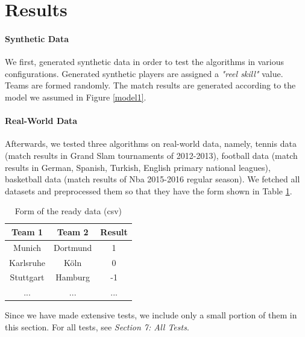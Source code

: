 \documentclass[12pt]{article}
\begin{document}
\section{Results}
\paragraph{Synthetic Data}
We first, generated synthetic data in order to test the algorithms in various configurations. Generated synthetic players are assigned a \textit{"reel skill"} value. Teams are formed randomly. The match results are generated according to the model we assumed in Figure \ref{model1}.
\paragraph{Real-World Data}
Afterwards, we tested three algorithms on real-world data, namely, tennis data (match results in Grand Slam tournaments of 2012-2013), football data (match results in German, Spanish, Turkish, English primary national leagues), basketball data (match results of Nba 2015-2016 regular season). We fetched all datasets and preprocessed them so that they have the form shown in Table \ref{data_form}.

\begin{table}[!ht]
	\centering
	
	\begin{tabular}{@{}ccc@{}}
		\toprule
		\textbf{Team 1} & \textbf{Team 2} & \textbf{Result} \\ \midrule
		Munich          & Dortmund        & 1               \\
		Karlsruhe       & Köln            & 0               \\
		Stuttgart       & Hamburg         & -1              \\
		...             & ...             & ...             \\ \bottomrule
	\end{tabular}
	\caption{Form of the ready data (csv)}
	\label{data_form}
\end{table}

Since we have made extensive tests, we include only a small portion of them in this section. For all tests, see \textit{Section 7: All Tests}.
\end{document}
